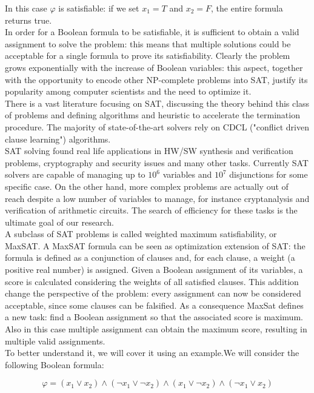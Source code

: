 In this case $\varphi$ is satisfiable: if we set $x_1 = T$ and $x_2 = F$, the entire formula returns true. \\
In order for a Boolean formula to be satisfiable, it is sufficient to obtain a valid assignment to solve the problem: this means that multiple solutions could be acceptable for a single formula to prove its satisfiability. Clearly the problem grows exponentially with the increase of Boolean variables: this aspect, together with the opportunity to encode other NP-complete problems into SAT, justify its popularity among computer scientists and the need to optimize it. \\
There is a vast literature focusing on SAT, discussing the theory behind this class of problems and defining algorithms and heuristic to accelerate the termination procedure. The majority of state-of-the-art solvers rely on CDCL ("conflict driven clause learning") algorithms. \\
SAT solving found real life applications in HW/SW synthesis and verification problems, cryptography and security issues and many other tasks. Currently SAT solvers are capable of managing up to $10^6$ variables and $10^7$ disjunctions for some specific case. On the other hand, more complex problems are actually out of reach despite a low number of variables to manage, for instance cryptanalysis and verification of arithmetic circuits. The search of efficiency for these tasks is the ultimate goal of our research. \\
A subclass of SAT problems is called weighted maximum satisfiability, or MaxSAT. A MaxSAT formula can be seen as optimization extension of SAT: the formula is defined as a conjunction of clauses and, for each clause, a weight (a positive real number) is assigned. Given a Boolean assignment of its variables, a score is calculated considering the weights of all satisfied clauses. This addition change the perspective of the problem: every assignment can now be considered acceptable, since some clauses can be falsified. As a consequence MaxSat defines a new task: find a Boolean assignment so that the associated score is maximum. Also in this case multiple assignment can obtain the maximum score, resulting in multiple valid assignments. \\
To better understand it, we will cover it using an example.We will consider the following Boolean formula:

\begin{equation}
    \varphi = ( x_1 \vee x_2) \wedge (\neg x_1 \vee \neg x_2) \wedge ( x_1 \vee \neg x_2) \wedge (\neg x_1 \vee x_2)
\end{equation}

